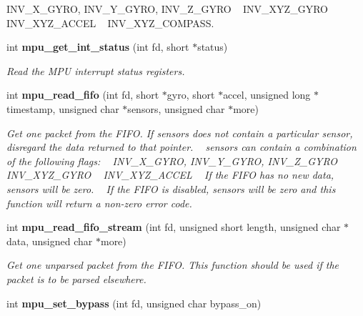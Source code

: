 \begin{DoxyCompactItemize}
\begin{DoxyCompactList}
 I\+N\+V\+\_\+\+X\+\_\+\+G\+Y\+RO, I\+N\+V\+\_\+\+Y\+\_\+\+G\+Y\+RO, I\+N\+V\+\_\+\+Z\+\_\+\+G\+Y\+RO ~\newline
 I\+N\+V\+\_\+\+X\+Y\+Z\+\_\+\+G\+Y\+RO ~\newline
 I\+N\+V\+\_\+\+X\+Y\+Z\+\_\+\+A\+C\+C\+EL ~\newline
 I\+N\+V\+\_\+\+X\+Y\+Z\+\_\+\+C\+O\+M\+P\+A\+SS. \end{DoxyCompactList}\item 
int \textbf{ mpu\+\_\+get\+\_\+int\+\_\+status} (int fd, short $\ast$status)
\begin{DoxyCompactList}\small\item\em Read the M\+PU interrupt status registers. \end{DoxyCompactList}\item 
int \textbf{ mpu\+\_\+read\+\_\+fifo} (int fd, short $\ast$gyro, short $\ast$accel, unsigned long $\ast$timestamp, unsigned char $\ast$sensors, unsigned char $\ast$more)
\begin{DoxyCompactList}\small\item\em Get one packet from the F\+I\+FO. If {\itshape sensors} does not contain a particular sensor, disregard the data returned to that pointer. ~\newline
 {\itshape sensors} can contain a combination of the following flags\+: ~\newline
 I\+N\+V\+\_\+\+X\+\_\+\+G\+Y\+RO, I\+N\+V\+\_\+\+Y\+\_\+\+G\+Y\+RO, I\+N\+V\+\_\+\+Z\+\_\+\+G\+Y\+RO ~\newline
 I\+N\+V\+\_\+\+X\+Y\+Z\+\_\+\+G\+Y\+RO ~\newline
 I\+N\+V\+\_\+\+X\+Y\+Z\+\_\+\+A\+C\+C\+EL ~\newline
 If the F\+I\+FO has no new data, {\itshape sensors} will be zero. ~\newline
 If the F\+I\+FO is disabled, {\itshape sensors} will be zero and this function will return a non-\/zero error code. \end{DoxyCompactList}\item 
int \textbf{ mpu\+\_\+read\+\_\+fifo\+\_\+stream} (int fd, unsigned short length, unsigned char $\ast$data, unsigned char $\ast$more)
\begin{DoxyCompactList}\small\item\em Get one unparsed packet from the F\+I\+FO. This function should be used if the packet is to be parsed elsewhere. \end{DoxyCompactList}\item 
int \textbf{ mpu\+\_\+set\+\_\+bypass} (int fd, unsigned char bypass\+\_\+on)

\end{DoxyCompactItemize}
